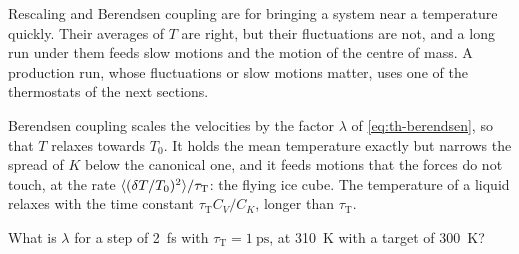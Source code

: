 \begin{practice}
Rescaling and Berendsen coupling are for bringing a system near a
temperature quickly. Their averages of $T$ are right, but their
fluctuations are not, and a long run under them feeds slow motions and
the motion of the centre of mass. A production run, whose fluctuations or slow motions matter,
uses one of the thermostats of the next sections.
\end{practice}

\begin{keyidea}
Berendsen coupling scales the velocities by the factor $\lambda$ of
\cref{eq:th-berendsen}, so that $T$ relaxes towards $T_0$.
It holds the mean temperature exactly but narrows the spread of $K$
below the canonical one, and it feeds motions that the forces do not
touch, at the rate $\langle (\delta T/T_0)^2 \rangle/\tau_{\mathrm T}$: the flying
ice cube. The
temperature of a liquid relaxes with the time constant $\tau_{\mathrm T}
C_V/C_K$, longer than $\tau_{\mathrm T}$.
\end{keyidea}


\begin{selfcheck}
What is $\lambda$ for a step of \SI{2}{\femto\second} with $\tau_{\mathrm
T} = \SI{1}{\pico\second}$, at \SI{310}{\kelvin} with a target of
\SI{300}{\kelvin}?
\end{selfcheck}
